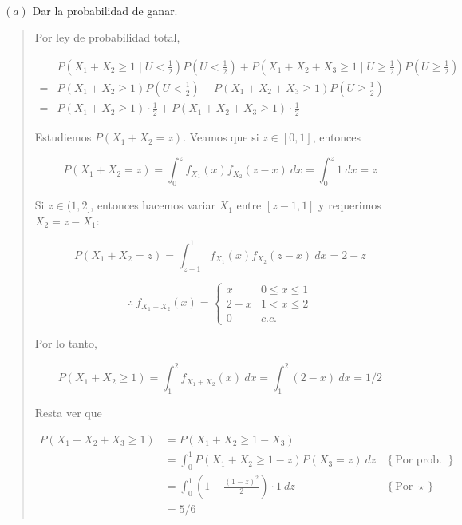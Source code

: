 \documentclass[a4paper, 12pt]{article}
\begin{document}
~

$(a)$ Dar la probabilidad de ganar.


\small
\begin{quote}

Por ley de probabilidad total,

\begin{align*}
  &P(X_1 + X_2 \geq 1 \mid U < \frac{1}{2})P(U < \frac{1}{2}) + P(X_1 +
  X_2 + X_3 \geq 1\mid
  U \geq \frac{1}{2})P(U \geq \frac{1}{2}) \\ 
  =&P(X_1 + X_2 \geq 1)P(U < \frac{1}{2}) + P(X_1 + X_2 + X_3 \geq 1)P(U \geq
  \frac{1}{2})\\
  =&P(X_1 + X_2 \geq 1)\cdot \frac{1}{2} + P(X_1 + X_2 + X_3 \geq
  1)\cdot \frac{1}{2}
\end{align*}

Estudiemos $P(X_1 + X_2 = z)$. Veamos que si $z \in [0, 1]$, entonces

\begin{equation*}
  P(X_1 + X_2 = z) = \int_0^z f_{X_1}(x)f_{X_2}(z-x) ~ dx = \int_0^z 1 ~ dx 
  =z
\end{equation*}

Si $z \in (1, 2]$, entonces hacemos variar $X_1$ entre $[z-1, 1]$ y requerimos
$X_2 = z - X_1$:

\begin{equation*}
  P(X_1 + X_2 = z) 
  = \int_{z-1}^{1} f_{X_1}(x) f_{X_2}(z - x) ~  dx = 2 -z
\end{equation*}



\begin{equation*}
  \therefore ~ f_{X_1 + X_2}(x) = \begin{cases}
    x & 0 \leq x \leq 1 \\ 
    2 - x & 1 < x \leq 2 \\ 
    0 & c.c.
  \end{cases}
\end{equation*}

Por lo tanto,

\begin{equation*}
  P(X_1 + X_2 \geq 1) = \int_1^2 f_{X_1 + X_2}(x) ~ dx = \int_1^2(2-x) ~ dx =
  1 / 2
\end{equation*}

Resta ver que 

\begin{align*}
  P(X_1 + X_2 + X_3 \geq 1) 
  &= P(X_1 + X_2 \geq 1 - X_3) \\ 
  &=\int_0^1  P(X_1 + X_2 \geq 1 - z) P(X_3 = z) ~ dz &\left\{ \text{Por prob.
  total} \right\} \\ 
  &=\int_0^1 \left(1 - \frac{(1-z)^2}{2}\right) \cdot 1 ~ dz &\left\{ \text{Por }
  \star\right\} \\ 
  &=5 / 6
\end{align*}


\end{quote}
\end{document}
